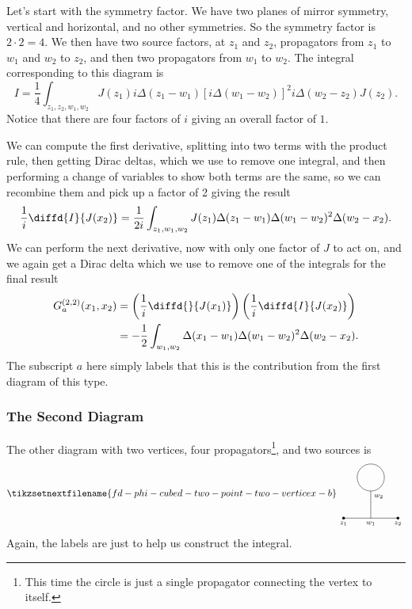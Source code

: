 \documentclass[fleqn]{NotesClass}
\begin{document}
    Let's start with the symmetry factor.
    We have two planes of mirror symmetry, vertical and horizontal, and no other symmetries.
    So the symmetry factor is \(2 \cdot 2 = 4\).
    We then have two source factors, at \(z_1\) and \(z_2\), propagators from \(z_1\) to \(w_1\) and \(w_2\) to \(z_2\), and then two propagators from \(w_1\) to \(w_2\).
    The integral corresponding to this diagram is
    \begin{equation}
        I = \frac{1}{4} \int_{z_1, z_2, w_1, w_2} J(z_1) i\Delta(z_1 - w_1)[i\Delta(w_1 - w_2)]^2 i\Delta(w_2 - z_2) J(z_2).
    \end{equation}
    Notice that there are four factors of \(i\) giving an overall factor of \(1\).
    
    We can compute the first derivative, splitting into two terms with the product rule, then getting Dirac deltas, which we use to remove one integral, and then performing a change of variables to show both terms are the same, so we can recombine them and pick up a factor of 2 giving the result
    \begin{equation}
        \frac{1}{i} \diffd{I}{J(x_2)} = \frac{1}{2i} \int_{z_1,w_1,w_2} J(z_1)\Delta(z_1 - w_1)\Delta(w_1 - w_2)^2\Delta(w_2 - x_2).
    \end{equation} 
    We can perform the next derivative, now with only one factor of \(J\) to act on, and we again get a Dirac delta which we use to remove one of the integrals for the final result
    \begin{align}
        G^{(2, 2)}_a(x_1, x_2) &= \left( \frac{1}{i} \diffd{}{J(x_1)} \right)\left( \frac{1}{i} \diffd{I}{J(x_2)} \right)\\
        &= -\frac{1}{2} \int_{w_1, w_2} \Delta(x_1 - w_1)\Delta(w_1 - w_2)^2\Delta(w_2 - x_2).
    \end{align}
    The subscript \(a\) here simply labels that this is the contribution from the first diagram of this type.
    
    \subsubsection{The Second Diagram}
    The other diagram with two vertices, four propagators\footnote{This time the circle is just a single propagator connecting the vertex to itself.}, and two sources is
    \begin{equation}\label{eqn:one particle reduicible second order diagram}
        \tikzsetnextfilename{fd-phi-cubed-two-point-two-verticex-b}
        \begin{tikzpicture}[baseline=(current bounding box)]
            \draw (-1, 0) node [below] {\scriptsize\(z_1\)} -- (1, 0) node [below] {\scriptsize\(z_2\)};
            \fill (-1, 0) circle [radius = 0.05];
            \fill (1, 0) circle [radius = 0.05];
            \draw (0, 0) node [below] {\scriptsize\(w_1\)} -- (0, 1) node [below right] {\scriptsize\(w_2\)};
            \draw (0, 1.5) circle [radius = 0.5];
        \end{tikzpicture}
    \end{equation}
    Again, the labels are just to help us construct the integral.
    
\end{document}
